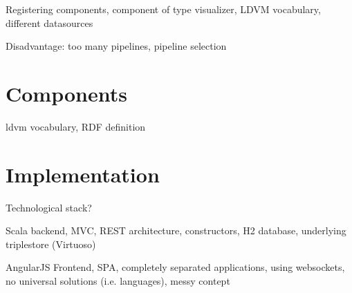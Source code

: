 Registering components, component of type visualizer, LDVM vocabulary, different datasources

Disadvantage: too many pipelines, pipeline selection

\section{Components}

ldvm vocabulary, RDF definition

\section{Implementation}

Technological stack?

Scala backend, MVC, REST architecture, constructors, H2 database, underlying triplestore (Virtuoso)

AngularJS Frontend, SPA, completely separated applications, using websockets, no universal solutions (i.e. languages), messy contept

